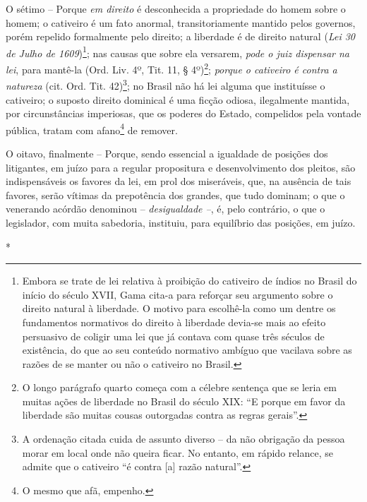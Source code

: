 O sétimo -- Porque \emph{em direito} é desconhecida a propriedade do
homem sobre o homem; o cativeiro é um fato anormal, transitoriamente
mantido pelos governos, porém repelido formalmente pelo direito; a
liberdade é de direito natural (\emph{Lei 30 de Julho de
1609})\footnote{Embora se trate de lei relativa à proibição do cativeiro
  de índios no Brasil do início do século XVII, Gama cita-a para
  reforçar seu argumento sobre o direito natural à liberdade. O motivo
  para escolhê-la como um dentre os fundamentos normativos do direito à
  liberdade devia-se mais ao efeito persuasivo de coligir uma lei que já
  contava com quase três séculos de existência, do que ao seu conteúdo
  normativo ambíguo que vacilava sobre as razões de se manter ou não o
  cativeiro no Brasil.}; nas causas que sobre ela versarem, \emph{pode o
juiz dispensar na lei}, para mantê-la (Ord. Liv. 4º, Tit. 11, §
4º)\footnote{O longo parágrafo quarto começa com a célebre sentença que
  se leria em muitas ações de liberdade no Brasil do século XIX: ``E
  porque em favor da liberdade são muitas cousas outorgadas contra as
  regras gerais''.}; \emph{porque o cativeiro é contra a natureza} (cit.
Ord. Tit. 42)\footnote{A ordenação citada cuida de assunto diverso -- da
  não obrigação da pessoa morar em local onde não queira ficar. No
  entanto, em rápido relance, se admite que o cativeiro ``é contra
  {[}a{]} razão natural''.}; no Brasil não há lei alguma que instituísse
o cativeiro; o suposto direito dominical é uma ficção odiosa,
ilegalmente mantida, por circunstâncias imperiosas, que os poderes do
Estado, compelidos pela vontade pública, tratam com afano\footnote{O
  mesmo que afã, empenho.} de remover.

O oitavo, finalmente -- Porque, sendo essencial a igualdade de posições
dos litigantes, em juízo para a regular propositura e desenvolvimento
dos pleitos, são indispensáveis os favores da lei, em prol dos
miseráveis, que, na ausência de tais favores, serão vítimas da
prepotência dos grandes, que tudo dominam; o que o venerando acórdão
denominou -- \emph{desigualdade --}, é, pelo contrário, o que o
legislador, com muita sabedoria, instituiu, para equilíbrio das
posições, em juízo.

*


